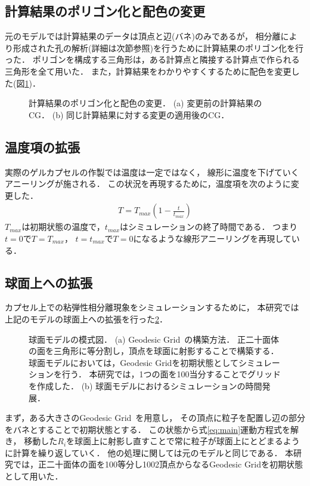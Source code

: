\subsection{計算結果のポリゴン化と配色の変更}
元のモデルでは計算結果のデータは頂点と辺(バネ)のみであるが，
相分離により形成された孔の解析(詳細は次節参照)を行うために計算結果のポリゴン化を行った．
ポリゴンを構成する三角形は，ある計算点と隣接する計算点で作られる三角形を全て用いた．
また，計算結果をわかりやすくするために配色を変更した(図\ref{fig:polygon})．
\begin{figure}
    \centering
    
    \caption{
        計算結果のポリゴン化と配色の変更．
        (a) 変更前の計算結果のCG．
        (b) 同じ計算結果に対する変更の適用後のCG．
    }
    \label{fig:polygon}
\end{figure}


\subsection{温度項の拡張}
実際のゲルカプセルの作製では温度は一定ではなく，
線形に温度を下げていくアニーリングが施される．
この状況を再現するために，温度項を次のように変更した．
\begin{eqnarray}
    \label{eq:thermal}
    T = T_{max}(1-\frac{t}{t_{max}})
\end{eqnarray}
$T_{max}$は初期状態の温度で，$t_{max}$はシミュレーションの終了時間である．
つまり$t=0$で$T=T_{max}$，
$t=t_{max}$で$T=0$になるような線形アニーリングを再現している．


\subsection{球面上への拡張}
カプセル上での粘弾性相分離現象をシミュレーションするために，
本研究では上記のモデルの球面上への拡張を行った\ref{fig:model_sphere}．
\begin{figure}
    \centering
    
    \caption{
        球面モデルの模式図．
        (a) Geodesic Grid~\cite{Geodesic}の構築方法．
            正二十面体の面を三角形に等分割し，頂点を球面に射影することで構築する．
            球面モデルにおいては，Geodesic Gridを初期状態としてシミュレーションを行う．
            本研究では，1つの面を100当分することでグリッドを作成した．
        (b) 球面モデルにおけるシミュレーションの時間発展．
    }
    \label{fig:model_sphere}
\end{figure}

まず，ある大きさのGeodesic Grid~\cite{Geodesic}を用意し，
その頂点に粒子を配置し辺の部分をバネとすることで初期状態とする．
この状態から式\ref{eq:main}運動方程式を解き，
移動した$R_i$を球面上に射影し直すことで常に粒子が球面上にとどまるように計算を繰り返していく．
他の処理に関しては元のモデルと同じである．
本研究では，正二十面体の面を100等分し1002頂点からなるGeodesic Gridを初期状態として用いた．


